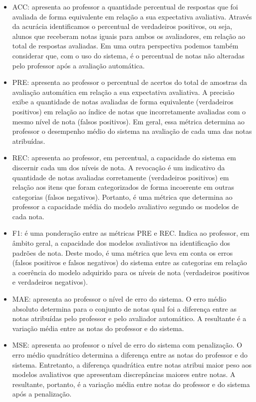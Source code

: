 \begin{itemize}
	\item ACC: apresenta ao professor a quantidade percentual de respostas que foi avaliada de forma equivalente em relação a sua expectativa avaliativa. Através da acurácia identificamos o percentual de verdadeiros positivos, ou seja, alunos que receberam notas iguais para ambos os avaliadores, em relação ao total de respostas avaliadas. Em uma outra perspectiva podemos também considerar que, com o uso do sistema, é o percentual de notas não alteradas pelo professor após a avaliação automática.

	\item PRE: apresenta ao professor o percentual de acertos do total de amostras da avaliação automática em relação a sua expectativa avaliativa. A precisão exibe a quantidade de notas avaliadas de forma equivalente (verdadeiros positivos) em relação ao índice de notas que incorretamente avaliadas com o mesmo nível de nota (falsos positivos). Em geral, essa métrica determina ao professor o desempenho médio do sistema na avaliação de cada uma das notas atribuídas.

	\item REC: apresenta ao professor, em percentual, a capacidade do sistema em discernir cada um dos níveis de nota. A revocação é um indicativo da quantidade de notas avaliadas corretamente (verdadeiros positivos) em relação aos itens que foram categorizados de forma incoerente em outras categorias (falsos negativos). Portanto, é uma métrica que determina ao professor a capacidade média do modelo avaliativo segundo os modelos de cada nota.


	\item F1: é uma ponderação entre as métricas PRE e REC. Indica ao professor, em âmbito geral, a capacidade dos modelos avaliativos na identificação dos padrões de nota. Deste modo, é uma métrica que leva em conta os erros (falsos positivos e falsos negativos) do sistema entre as categorias em relação a coerência do modelo adquirido para os níveis de nota (verdadeiros positivos e verdadeiros negativos).

	\item MAE: apresenta ao professor o nível de erro do sistema. O erro médio absoluto determina para o conjunto de notas qual foi a diferença entre as notas atribuídas pelo professor e pelo avaliador automático. A resultante é a variação média entre as notas do professor e do sistema.

	\item MSE: apresenta ao professor o nível de erro do sistema com penalização. O erro médio quadrático determina a diferença entre as notas do professor e do sistema. Entretanto, a diferença quadrática entre notas atribui maior peso aos modelos avaliativos que apresentam discrepâncias maiores entre notas. A resultante, portanto, é a variação média entre notas do professor e do sistema após a penalização.

\end{itemize}

